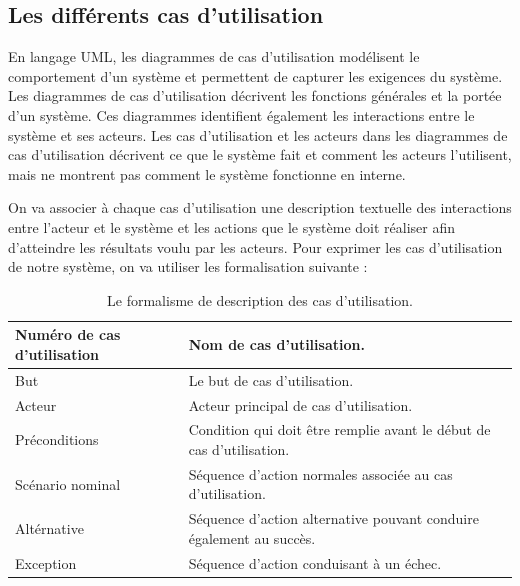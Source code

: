 \subsection{Les différents cas d'utilisation }
\par En langage UML, les diagrammes de cas d'utilisation modélisent le comportement d'un système et permettent de capturer les exigences du système.
Les diagrammes de cas d'utilisation décrivent les fonctions générales et la portée d'un système. Ces diagrammes identifient également les interactions entre le système et ses acteurs. Les cas d'utilisation et les acteurs dans les diagrammes de cas d'utilisation décrivent ce que le système fait et comment les acteurs l'utilisent, mais ne montrent pas comment le système fonctionne en interne.\cite{ref4}
\par On va associer à chaque cas d’utilisation une description  textuelle des interactions entre l’acteur et le système et les actions que le système doit réaliser afin d’atteindre les résultats voulu par les acteurs. Pour exprimer les cas d’utilisation de notre système, on va utiliser les formalisation suivante :


\begin{table}[H]
    \begin{tabular}{ | p{5cm} | p{10cm} |}
    \hline
    Numéro de cas d’utilisation & Nom de cas d’utilisation. \\ 
    \hline  
    But & Le but de cas d’utilisation.\\ 
    \hline
    Acteur & Acteur principal de cas d’utilisation. \\ \hline
    Préconditions & Condition qui doit être remplie avant le début de cas d’utilisation.  \\
    \hline
    Scénario nominal & Séquence d’action normales associée au cas d’utilisation.\\
    \hline
    Altérnative & Séquence d’action alternative pouvant conduire également au succès. \\
    \hline
    Exception & Séquence d’action conduisant à un échec. \\
     \hline
    \end{tabular}
     \caption{Le formalisme de description des cas d'utilisation.}
    \label{tab:my_label}
\end{table}




